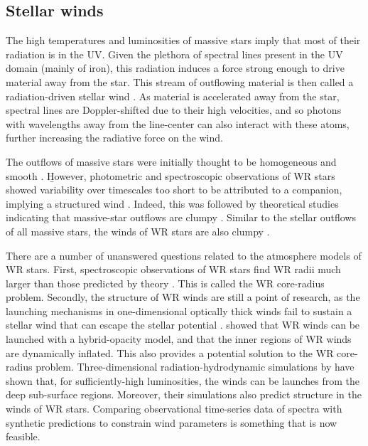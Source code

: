 \subsection{Stellar winds}

The high temperatures and luminosities of massive stars imply that most of their radiation is in the UV. Given the plethora of spectral lines present in the UV domain (mainly of iron), this radiation induces a force strong enough to drive material away from the star. This stream of outflowing material is then called a radiation-driven stellar wind \citep{1970LucySolomon,1975castor}. As material is accelerated away from the star, spectral lines are Doppler-shifted due to their high velocities, and so photons with wavelengths away from the line-center can also interact with these atoms, further increasing the radiative force on the wind.

The outflows of massive stars were initially thought to be homogeneous and smooth \citep{1988deJager,1990Nieuwenhuijzen}. \b{However, photometric and spectroscopic observations of WR stars showed variability over timescales too short to be attributed to a companion, implying a structured wind \citep{1974Moffat_WR_variability,1987Lamontagne_WR_variability,1986MoffatShara,1988Moffat_clumping_WR,1995Brown_WR_clumping,lepine_wind_2000}. Indeed, this was followed by theoretical studies indicating that massive-star outflows are clumpy \citep{1988Owocki,2005DessartOwocki,2013SundqvistOwocki,2018Sundqvist,2019A&A...631A.172D}}. Similar to the stellar outflows of all massive stars, the winds of WR stars are also clumpy \citep{1991Hillier_clumping_escattering,1998Hamann_clumping,puls_bright_2006,fullerton_discordance_2006}.

There are a number of unanswered questions related to the atmosphere models of WR stars. First, spectroscopic observations of WR stars find WR radii much larger than those predicted by theory \citep{2007Crowther,hamann_galactic_2019,sander_galactic_2019}. This is called the WR core-radius problem. Secondly, the structure of WR winds are still a point of research, as the launching mechanisms in one-dimensional optically thick winds fail to sustain a stellar wind that can escape the stellar potential \citep[e.g.][]{2016Ro_WR_winds,2017Sander_WR_winds}. \citet{2021Poniatowski} showed that WR winds can be launched with a hybrid-opacity model, and that the inner regions of WR winds are dynamically inflated. This also provides a potential solution to the WR core-radius problem. Three-dimensional radiation-hydrodynamic simulations by \citet{2022Moens} have shown that, for sufficiently-high luminosities, the winds can be launches from the deep sub-surface regions. Moreover, their simulations also predict structure in the winds of WR stars. Comparing observational time-series data of spectra \citep[e.g.][]{lepine_wind_2000} with synthetic predictions to constrain wind parameters is something that is now feasible.

